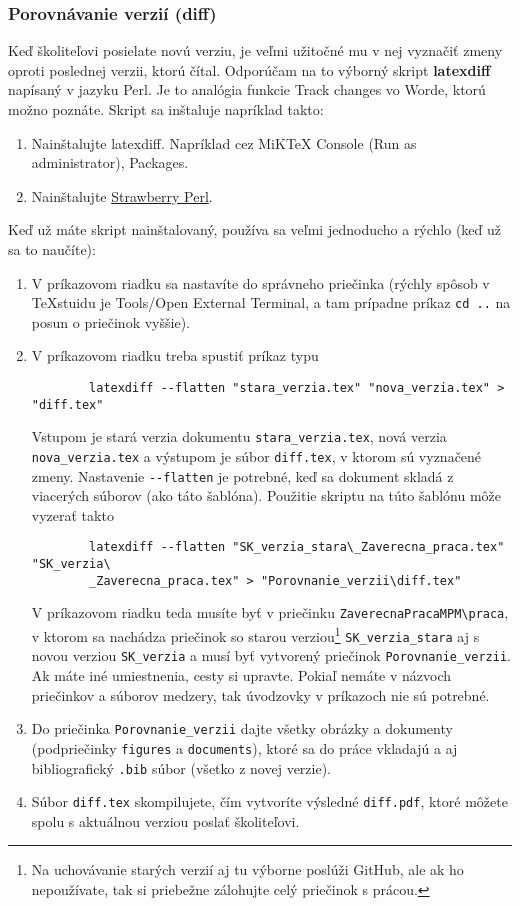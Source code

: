 \subsubsection{Porovnávanie verzií (diff)}
Keď školiteľovi posielate novú verziu, je veľmi užitočné mu v nej vyznačiť zmeny oproti poslednej verzii, ktorú čítal. Odporúčam na to výborný skript \textbf{latexdiff} napísaný v jazyku Perl. Je to analógia funkcie Track changes vo Worde, ktorú možno poznáte. Skript sa inštaluje napríklad takto:
\begin{enumerate}
	\item Nainštalujte latexdiff. Napríklad cez MiKTeX Console (Run as administrator), Packages.
	\item Nainštalujte \href{https://strawberryperl.com/}{Strawberry Perl}.
\end{enumerate}
Keď už máte skript nainštalovaný, používa sa veľmi jednoducho a rýchlo (keď už sa to naučíte):
\begin{enumerate}
	\item V príkazovom riadku sa nastavíte do správneho priečinka (rýchly spôsob v TeXstuidu je Tools/Open External Terminal, a tam prípadne príkaz \verb|cd ..| na posun o priečinok vyššie).
	\item V príkazovom riadku treba spustiť príkaz typu
	\begin{verbatim}
		latexdiff --flatten "stara_verzia.tex" "nova_verzia.tex" > "diff.tex"
	\end{verbatim}
	Vstupom je stará verzia dokumentu \verb|stara_verzia.tex|, nová verzia \verb|nova_verzia.tex| a výstupom je súbor \verb|diff.tex|, v ktorom sú vyznačené zmeny. Nastavenie \verb|--flatten| je potrebné, keď sa dokument skladá z viacerých súborov (ako táto šablóna). Použitie skriptu na túto šablónu môže vyzerať takto
	\begin{verbatim}
		latexdiff --flatten "SK_verzia_stara\_Zaverecna_praca.tex" "SK_verzia\
		_Zaverecna_praca.tex" > "Porovnanie_verzii\diff.tex"
	\end{verbatim}
	V príkazovom riadku teda musíte byť v priečinku \verb|ZaverecnaPracaMPM\praca|, v ktorom sa nachádza priečinok so starou verziou\footnote{Na uchovávanie starých verzií aj tu výborne poslúži GitHub, ale ak ho nepoužívate, tak si priebežne zálohujte celý priečinok s prácou.} \verb|SK_verzia_stara| aj s novou verziou \verb|SK_verzia| a musí byť vytvorený priečinok \verb|Porovnanie_verzii|. Ak máte iné umiestnenia, cesty si upravte. Pokiaľ nemáte v názvoch priečinkov a súborov medzery, tak úvodzovky v príkazoch nie sú potrebné.
	\item Do priečinka \verb|Porovnanie_verzii| dajte všetky obrázky a dokumenty (podpriečinky \verb|figures| a \verb|documents|), ktoré sa do práce vkladajú a aj bibliografický \verb|.bib| súbor (všetko z novej verzie).
	\item Súbor \verb|diff.tex| skompilujete, čím vytvoríte výsledné \verb|diff.pdf|, ktoré môžete spolu s aktuálnou verziou poslať školiteľovi.
\end{enumerate}







